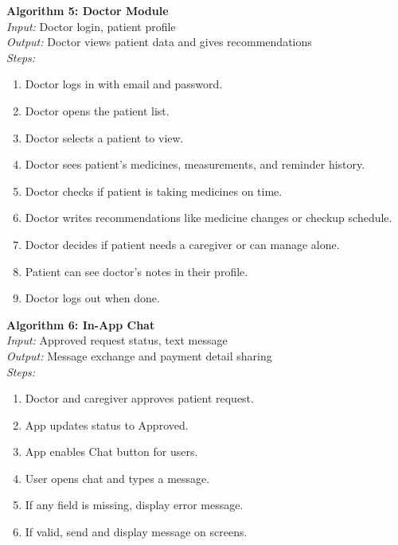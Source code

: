 \documentclass[12pt, a4paper, oneside]{report}
\begin{document}
\textbf{Algorithm 5: Doctor Module}\\
\textit{Input:} Doctor login, patient profile\\
\textit{Output:} Doctor views patient data and gives recommendations\\
\textit{Steps:}
\begin{enumerate}
    \item Doctor logs in with email and password.
    \item Doctor opens the patient list.
    \item Doctor selects a patient to view.
    \item Doctor sees patient's medicines, measurements, and reminder history.
    \item Doctor checks if patient is taking medicines on time.
    \item Doctor writes recommendations like medicine changes or checkup schedule.
    \item Doctor decides if patient needs a caregiver or can manage alone.
    \item Patient can see doctor's notes in their profile.
    \item Doctor logs out when done.
\end{enumerate}

\textbf{Algorithm 6: In-App Chat}\\
\textit{Input:} Approved request status, text message\\
\textit{Output:} Message exchange and payment detail sharing\\
\textit{Steps:}
\begin{enumerate}
    \item Doctor and caregiver approves patient request.
    \item App updates status to Approved.
    \item App enables Chat button for users.
    \item User opens chat and types a message.
    \item If any field is missing, display error message.
    \item If valid, send and display message on screens.
\end{enumerate}
\end{document}

